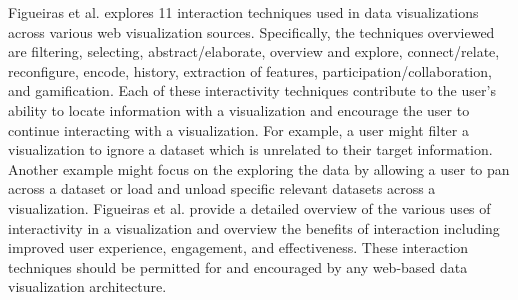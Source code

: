 Figueiras et al. \cite{interaction} explores 11 interaction techniques used in data visualizations across various web visualization sources.  Specifically, the techniques overviewed are filtering, selecting, abstract/elaborate, overview and explore, connect/relate, reconfigure, encode, history, extraction of features, participation/collaboration, and gamification. Each of these interactivity techniques contribute to the user’s ability to locate information with a visualization and encourage the user to continue interacting with a visualization.  For example, a user might filter a visualization to ignore a dataset which is unrelated to their target information.  Another example might focus on the exploring the data by allowing a user to pan across a dataset or load and unload specific relevant datasets across a visualization.  Figueiras et al. provide a detailed overview of the various uses of interactivity in a visualization and overview the benefits of interaction including improved user experience, engagement, and effectiveness.  These interaction techniques should be permitted for and encouraged by any web-based data visualization architecture. \par
